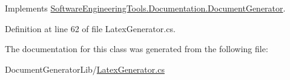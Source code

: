 Implements \hyperlink{class_software_engineering_tools_1_1_documentation_1_1_document_generator_af39f74148f77d9e036a9a3b284c4d569}{Software\+Engineering\+Tools.\+Documentation.\+Document\+Generator}.



Definition at line 62 of file Latex\+Generator.\+cs.



The documentation for this class was generated from the following file\+:\begin{DoxyCompactItemize}
\item 
Document\+Generator\+Lib/\hyperlink{_latex_generator_8cs}{Latex\+Generator.\+cs}\end{DoxyCompactItemize}
